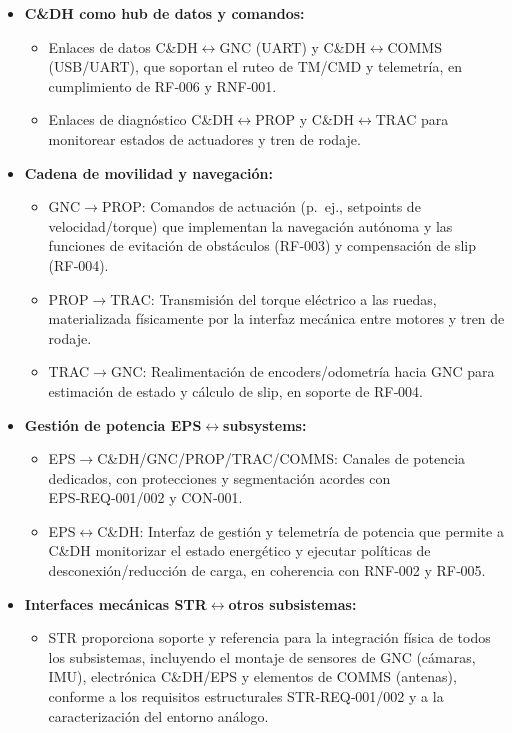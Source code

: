 \begin{itemize}
    \item \textbf{C\&DH como hub de datos y comandos:}
    \begin{itemize}
        \item Enlaces de datos C\&DH$\leftrightarrow$GNC (UART) y C\&DH$\leftrightarrow$COMMS (USB/UART), que soportan el ruteo de TM/CMD y telemetría, en cumplimiento de RF‑006 y RNF‑001.
        \item Enlaces de diagnóstico C\&DH$\leftrightarrow$PROP y C\&DH$\leftrightarrow$TRAC para monitorear estados de actuadores y tren de rodaje.
    \end{itemize}
    \item \textbf{Cadena de movilidad y navegación:}
    \begin{itemize}
        \item GNC$\rightarrow$PROP: Comandos de actuación (p.\ ej., setpoints de velocidad/torque) que implementan la navegación autónoma y las funciones de evitación de obstáculos (RF‑003) y compensación de slip (RF‑004).
        \item PROP$\rightarrow$TRAC: Transmisión del torque eléctrico a las ruedas, materializada físicamente por la interfaz mecánica entre motores y tren de rodaje.
        \item TRAC$\rightarrow$GNC: Realimentación de encoders/odometría hacia GNC para estimación de estado y cálculo de slip, en soporte de RF‑004.
    \end{itemize}
    \item \textbf{Gestión de potencia EPS$\leftrightarrow$subsystems:}
    \begin{itemize}
        \item EPS$\rightarrow$C\&DH/GNC/PROP/TRAC/COMMS: Canales de potencia dedicados, con protecciones y segmentación acordes con EPS‑REQ‑001/002 y CON‑001.
        \item EPS$\leftrightarrow$C\&DH: Interfaz de gestión y telemetría de potencia que permite a C\&DH monitorizar el estado energético y ejecutar políticas de desconexión/reducción de carga, en coherencia con RNF‑002 y RF‑005.
    \end{itemize}
    \item \textbf{Interfaces mecánicas STR$\leftrightarrow$otros subsistemas:}
    \begin{itemize}
        \item STR proporciona soporte y referencia para la integración física de todos los subsistemas, incluyendo el montaje de sensores de GNC (cámaras, IMU), electrónica C\&DH/EPS y elementos de COMMS (antenas), conforme a los requisitos estructurales STR‑REQ‑001/002 y a la caracterización del entorno análogo.
    \end{itemize}
\end{itemize}

